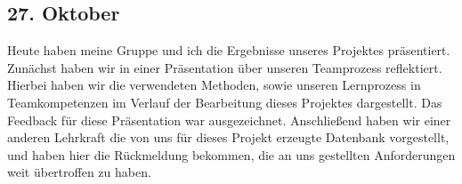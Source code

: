 \subsection{27. Oktober}

Heute haben meine Gruppe und ich die Ergebnisse unseres Projektes präsentiert. Zunächst haben wir in einer Präsentation über unseren Teamprozess reflektiert. Hierbei haben wir die verwendeten Methoden, sowie unseren Lernprozess in Teamkompetenzen im Verlauf der Bearbeitung dieses Projektes dargestellt. Das Feedback für diese Präsentation war ausgezeichnet.
Anschließend haben wir einer anderen Lehrkraft die von uns für dieses Projekt erzeugte Datenbank vorgestellt, und haben hier die Rückmeldung bekommen, die an uns gestellten Anforderungen weit übertroffen zu haben.